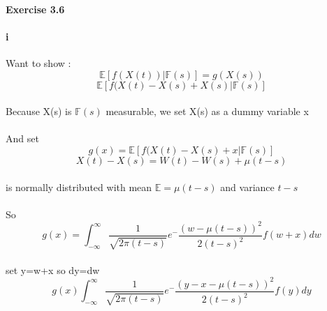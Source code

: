 \documentclass{article}
\begin{document}
\paragraph{Exercise 3.6}
\paragraph{i}{Want to show :\begin{displaymath}
                              \mathbb{E}[f(X(t))|\mathbb{F}(s)]=g(X(s))
                            \end{displaymath}}
\begin{displaymath}
 \mathbb{E}[f(X(t) -X(s)+X(s )|\mathbb{F}(s)]
\end{displaymath}
\paragraph{}{Because X(s) is $\mathbb{F}(s)$ measurable, we set X(s) as a dummy variable x}
\paragraph{}{And set \begin{displaymath}
                       g(x)=\mathbb{E}[f(X(t) -X(s)+x|\mathbb{F}(s)]
                     \end{displaymath}}
\begin{displaymath}
               X(t)-X(s)=W(t)-W(s)+\mu (t-s)
             \end{displaymath}\paragraph{}{ is normally distributed with mean $\mathbb{E}=\mu (t-s)$ and variance $t-s$}
\paragraph{}{So \begin{displaymath}
                  g(x)= \int_{-\infty}^{\infty}\frac{1}{\sqrt{2\pi (t-s)}}e^-\frac{(w-\mu(t-s))^2}{2(t-s)^2}f(w+x)dw
                \end{displaymath}}
\paragraph{}{set y=w+x so dy=dw}
\begin{displaymath}
  g(x)\int_{-\infty}^{\infty}\frac{1}{\sqrt{2\pi (t-s)}}e^-\frac{(y-x-\mu(t-s))^2}{2(t-s)^2}f(y)dy
\end{displaymath}
\end{document}
